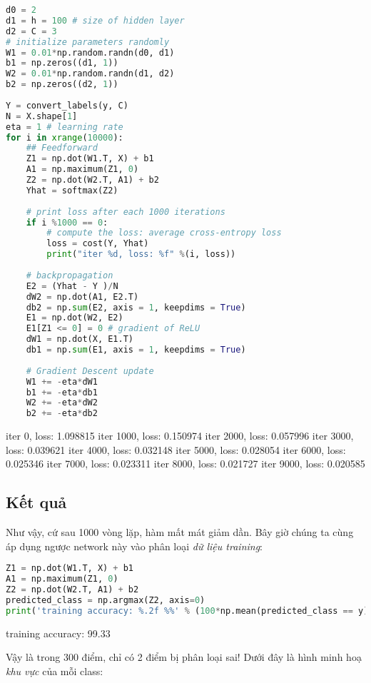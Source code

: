 \begin{lstlisting}[language=Python]
d0 = 2 
d1 = h = 100 # size of hidden layer 
d2 = C = 3 
# initialize parameters randomly 
W1 = 0.01*np.random.randn(d0, d1) 
b1 = np.zeros((d1, 1)) 
W2 = 0.01*np.random.randn(d1, d2) 
b2 = np.zeros((d2, 1)) 
 
Y = convert_labels(y, C) 
N = X.shape[1] 
eta = 1 # learning rate 
for i in xrange(10000): 
    ## Feedforward 
    Z1 = np.dot(W1.T, X) + b1 
    A1 = np.maximum(Z1, 0) 
    Z2 = np.dot(W2.T, A1) + b2 
    Yhat = softmax(Z2) 
 
    # print loss after each 1000 iterations 
    if i %1000 == 0: 
        # compute the loss: average cross-entropy loss 
        loss = cost(Y, Yhat) 
        print("iter %d, loss: %f" %(i, loss)) 
 
    # backpropagation 
    E2 = (Yhat - Y )/N 
    dW2 = np.dot(A1, E2.T) 
    db2 = np.sum(E2, axis = 1, keepdims = True) 
    E1 = np.dot(W2, E2) 
    E1[Z1 <= 0] = 0 # gradient of ReLU 
    dW1 = np.dot(X, E1.T) 
    db1 = np.sum(E1, axis = 1, keepdims = True) 
 
    # Gradient Descent update 
    W1 += -eta*dW1 
    b1 += -eta*db1 
    W2 += -eta*dW2 
    b2 += -eta*db2 
\end{lstlisting}
 
    iter 0, loss: 1.098815 
    iter 1000, loss: 0.150974 
    iter 2000, loss: 0.057996 
    iter 3000, loss: 0.039621 
    iter 4000, loss: 0.032148 
    iter 5000, loss: 0.028054 
    iter 6000, loss: 0.025346 
    iter 7000, loss: 0.023311 
    iter 8000, loss: 0.021727 
    iter 9000, loss: 0.020585 
 
 
 
\subsection{Kết quả}
Như vậy, cứ sau 1000 vòng lặp, hàm mất mát giảm dần. Bây giờ chúng ta cùng áp dụng ngược network này vào phân loại \textit{dữ liệu training}: 
 
 
\begin{lstlisting}[language=Python]
Z1 = np.dot(W1.T, X) + b1 
A1 = np.maximum(Z1, 0) 
Z2 = np.dot(W2.T, A1) + b2 
predicted_class = np.argmax(Z2, axis=0) 
print('training accuracy: %.2f %%' % (100*np.mean(predicted_class == y))) 
\end{lstlisting}
 
    training accuracy: 99.33 %
 
Vậy là trong 300 điểm, chỉ có 2 điểm bị phân loại sai! Dưới đây là hình minh hoạ \textit{khu vực} của mỗi class: 
 
